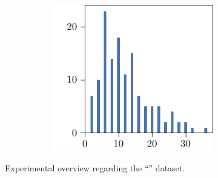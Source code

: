\begin{figure}[p]
\begin{subfigure}{\textwidth}
\begin{subfigure}{\mymultiouter}
    \end{subfigure}
    \begin{subfigure}{\mymultiouter}
        \centering
          \includegraphics[width=\mymultiinner]{figures/new/manhattan-wine-permutation-retraining}
      \end{subfigure}
  \end{subfigure}
    \caption{Experimental overview regarding the ``\wine{}'' dataset.}
\end{figure}



